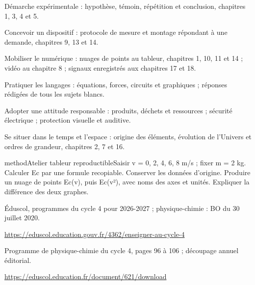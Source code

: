 \begin{questions}
\item Démarche expérimentale : hypothèse, témoin, répétition et conclusion, chapitres 1, 3, 4 et 5.
\item Concevoir un dispositif : protocole de mesure et montage répondant à une demande, chapitres 9, 13 et 14.
\item Mobiliser le numérique : nuages de points au tableur, chapitres 1, 10, 11 et 14 ; vidéo au chapitre 8 ; signaux enregistrés aux chapitres 17 et 18.
\item Pratiquer les langages : équations, forces, circuits et graphiques ; réponses rédigées de tous les sujets blancs.
\item Adopter une attitude responsable : produits, déchets et ressources ; sécurité électrique ; protection visuelle et auditive.
\item Se situer dans le temps et l’espace : origine des éléments, évolution de l’Univers et ordres de grandeur, chapitres 2, 7 et 16.
\end{questions}
\begin{pcEncadre}{method}{Atelier tableur reproductible}Saisir v = 0, 2, 4, 6, 8 m/s ; fixer m = 2 kg. Calculer Ec par une formule recopiable. Conserver les données d’origine. Produire un nuage de points Ec(v), puis Ec(v²), avec noms des axes et unités. Expliquer la différence des deux graphes.\end{pcEncadre}
\label{references}
\par\noindent\begin{minipage}{\linewidth}
Éduscol, programmes du cycle 4 pour 2026-2027 ; physique-chimie : BO du 30 juillet 2020.\par{\fontsize{8.5}{11}\selectfont\raggedright\url{https://eduscol.education.gouv.fr/4362/enseigner-au-cycle-4}\par}\end{minipage}\par
\par\noindent\begin{minipage}{\linewidth}
Programme de physique-chimie du cycle 4, pages 96 à 106 ; découpage annuel éditorial.\par{\fontsize{8.5}{11}\selectfont\raggedright\url{https://eduscol.education.fr/document/621/download}\par}\end{minipage}\par
